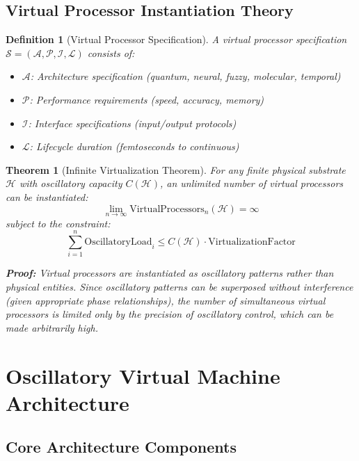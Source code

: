 \documentclass[12pt,a4paper]{article}
\newtheorem{theorem}{Theorem}
\newtheorem{definition}{Definition}
\begin{document}
\subsection{Virtual Processor Instantiation Theory}

\begin{definition}[Virtual Processor Specification]
A virtual processor specification $\mathcal{S} = (\mathcal{A}, \mathcal{P}, \mathcal{I}, \mathcal{L})$ consists of:
\begin{itemize}
\item $\mathcal{A}$: Architecture specification (quantum, neural, fuzzy, molecular, temporal)
\item $\mathcal{P}$: Performance requirements (speed, accuracy, memory)
\item $\mathcal{I}$: Interface specifications (input/output protocols)
\item $\mathcal{L}$: Lifecycle duration (femtoseconds to continuous)
\end{itemize}
\end{definition}

\begin{theorem}[Infinite Virtualization Theorem]
For any finite physical substrate $\mathcal{H}$ with oscillatory capacity $C(\mathcal{H})$, an unlimited number of virtual processors can be instantiated:
\begin{equation}
\lim_{n \rightarrow \infty} \text{VirtualProcessors}_n(\mathcal{H}) = \infty
\end{equation}
subject to the constraint:
\begin{equation}
\sum_{i=1}^{n} \text{OscillatoryLoad}_i \leq C(\mathcal{H}) \cdot \text{VirtualizationFactor}
\end{equation}

\textbf{Proof:}
Virtual processors are instantiated as oscillatory patterns rather than physical entities. Since oscillatory patterns can be superposed without interference (given appropriate phase relationships), the number of simultaneous virtual processors is limited only by the precision of oscillatory control, which can be made arbitrarily high.
\end{theorem}

\section{Oscillatory Virtual Machine Architecture}

\subsection{Core Architecture Components}
\end{document}
